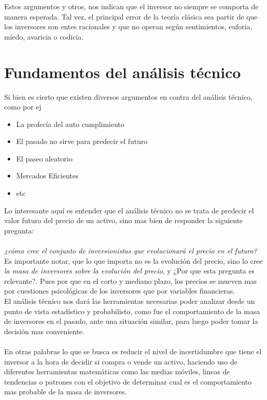 Estos argumentos y otros, nos indican que el inversor no siempre se comporta de manera esperada. Tal vez, el principal error de la teoría clásica sea partir de que los inversores son entes racionales y que no operan según sentimientos, euforia, miedo, avaricia o codicia.

\section{Fundamentos del análisis técnico}

Si bien es cierto que existen diversos argumentos en contra del análisis técnico, como por ej

\begin{itemize}
	\item La profecía del auto cumplimiento
	\item El pasado no sirve para predecir el futuro
	\item El paseo aleatorio
	\item Mercados Eficientes
	\item etc
\end{itemize}

Lo interesante aquí es entender que el análisis técnico no se trata de predecir el valor futuro del precio de un activo, sino mas bien de responder la siguiente pregunta:\\\\

\emph{¿cómo cree el conjunto de inversionistas que evolucionará el precio en el futuro? }
\\

Es importante notar, que lo que importa no es la evolución del precio, sino lo cree \emph{la masa de inversores sobre la evolución del precio}, y ¿Por que esta pregunta es relevante?. Pues por que en el corto y mediano plazo, los precios se mueven mas por cuestiones psicológicas de los inversores que por variables financieras.\\

El análisis técnico nos dará las herramientas necesarias poder analizar desde un punto de vista estadístico y probabilisto, como fue el comportamiento de la masa de inversores en el pasado, ante una situación similar, para luego poder tomar la decisión mas conveniente.
\\\\
En otras palabras lo que se busca es reducir el nivel de incertidumbre que tiene el inversor a la hora de decidir si compra o vende un activo, haciendo uso de diferentes herramientas matemáticas como las medias móviles, lineas de tendencias o patrones con el objetivo de determinar cual es el comportamiento mas probable de la masa de inversores.


